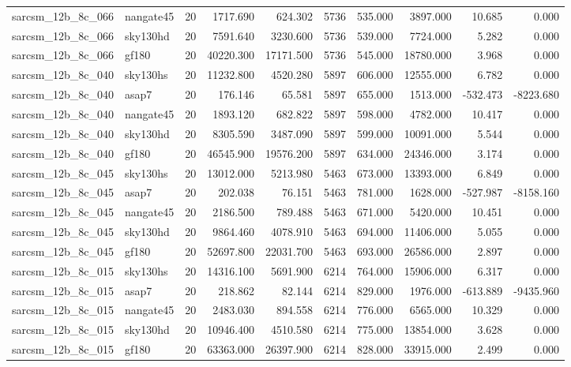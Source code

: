 \begin{tabular}{llrrrrrrrr}
sarcsm\_12b\_8c\_066 & nangate45 & 20 & 1717.690 & 624.302 & 5736 & 535.000 & 3897.000 & 10.685 & 0.000 \\
sarcsm\_12b\_8c\_066 & sky130hd & 20 & 7591.640 & 3230.600 & 5736 & 539.000 & 7724.000 & 5.282 & 0.000 \\
sarcsm\_12b\_8c\_066 & gf180 & 20 & 40220.300 & 17171.500 & 5736 & 545.000 & 18780.000 & 3.968 & 0.000 \\
sarcsm\_12b\_8c\_040 & sky130hs & 20 & 11232.800 & 4520.280 & 5897 & 606.000 & 12555.000 & 6.782 & 0.000 \\
sarcsm\_12b\_8c\_040 & asap7 & 20 & 176.146 & 65.581 & 5897 & 655.000 & 1513.000 & -532.473 & -8223.680 \\
sarcsm\_12b\_8c\_040 & nangate45 & 20 & 1893.120 & 682.822 & 5897 & 598.000 & 4782.000 & 10.417 & 0.000 \\
sarcsm\_12b\_8c\_040 & sky130hd & 20 & 8305.590 & 3487.090 & 5897 & 599.000 & 10091.000 & 5.544 & 0.000 \\
sarcsm\_12b\_8c\_040 & gf180 & 20 & 46545.900 & 19576.200 & 5897 & 634.000 & 24346.000 & 3.174 & 0.000 \\
sarcsm\_12b\_8c\_045 & sky130hs & 20 & 13012.000 & 5213.980 & 5463 & 673.000 & 13393.000 & 6.849 & 0.000 \\
sarcsm\_12b\_8c\_045 & asap7 & 20 & 202.038 & 76.151 & 5463 & 781.000 & 1628.000 & -527.987 & -8158.160 \\
sarcsm\_12b\_8c\_045 & nangate45 & 20 & 2186.500 & 789.488 & 5463 & 671.000 & 5420.000 & 10.451 & 0.000 \\
sarcsm\_12b\_8c\_045 & sky130hd & 20 & 9864.460 & 4078.910 & 5463 & 694.000 & 11406.000 & 5.055 & 0.000 \\
sarcsm\_12b\_8c\_045 & gf180 & 20 & 52697.800 & 22031.700 & 5463 & 693.000 & 26586.000 & 2.897 & 0.000 \\
sarcsm\_12b\_8c\_015 & sky130hs & 20 & 14316.100 & 5691.900 & 6214 & 764.000 & 15906.000 & 6.317 & 0.000 \\
sarcsm\_12b\_8c\_015 & asap7 & 20 & 218.862 & 82.144 & 6214 & 829.000 & 1976.000 & -613.889 & -9435.960 \\
sarcsm\_12b\_8c\_015 & nangate45 & 20 & 2483.030 & 894.558 & 6214 & 776.000 & 6565.000 & 10.329 & 0.000 \\
sarcsm\_12b\_8c\_015 & sky130hd & 20 & 10946.400 & 4510.580 & 6214 & 775.000 & 13854.000 & 3.628 & 0.000 \\
sarcsm\_12b\_8c\_015 & gf180 & 20 & 63363.000 & 26397.900 & 6214 & 828.000 & 33915.000 & 2.499 & 0.000 \\

\end{tabular}
